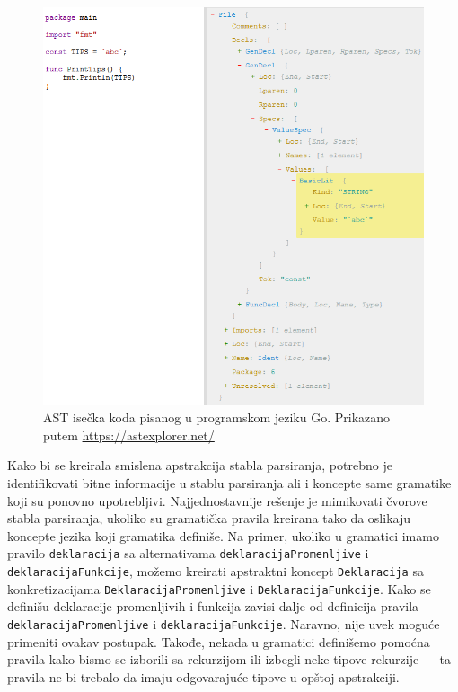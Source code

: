 \begin{figure}[h!]
\centering
\includegraphics[scale=0.7]{images/ast_go.png}
\caption{AST isečka koda pisanog u programskom jeziku Go. Prikazano putem \url{https://astexplorer.net/}}
\label{fig:ASTGo}
\end{figure}

Kako bi se kreirala smislena apstrakcija stabla parsiranja, potrebno je identifikovati bitne informacije u stablu parsiranja ali i koncepte same gramatike koji su ponovno upotrebljivi. Najjednostavnije rešenje je mimikovati čvorove stabla parsiranja, ukoliko su gramatička pravila kreirana tako da oslikaju koncepte jezika koji gramatika definiše. Na primer, ukoliko u gramatici imamo pravilo \texttt{deklaracija} sa alternativama \texttt{deklaracijaPromenljive} i \texttt{deklaracijaFunkcije}, možemo kreirati apstraktni koncept \texttt{Deklaracija} sa konkretizacijama \texttt{DeklaracijaPromenljive} i \texttt{DeklaracijaFunkcije}. Kako se definišu deklaracije promenljivih i funkcija zavisi dalje od definicija pravila \texttt{deklaracijaPromenljive} i \texttt{deklaracijaFunkcije}. Naravno, nije uvek moguće primeniti ovakav postupak. Takođe, nekada u gramatici definišemo pomoćna pravila kako bismo se izborili sa rekurzijom ili izbegli neke tipove rekurzije --- ta pravila ne bi trebalo da imaju odgovarajuće tipove u opštoj apstrakciji. 

